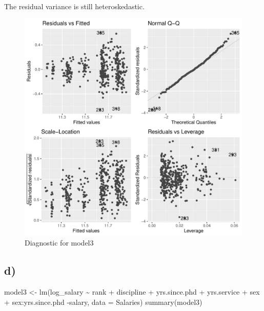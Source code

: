 \documentclass[
]{article}
\newenvironment{Shaded}{\begin{snugshade}}{\end{snugshade}}
\newcommand{\AttributeTok}[1]{\textcolor[rgb]{0.77,0.63,0.00}{#1}}
\newcommand{\ConstantTok}[1]{\textcolor[rgb]{0.00,0.00,0.00}{#1}}
\newcommand{\FunctionTok}[1]{\textcolor[rgb]{0.00,0.00,0.00}{#1}}
\newcommand{\NormalTok}[1]{#1}
\newcommand{\OtherTok}[1]{\textcolor[rgb]{0.56,0.35,0.01}{#1}}
\newcommand{\SpecialCharTok}[1]{\textcolor[rgb]{0.00,0.00,0.00}{#1}}
\begin{document}
The residual variance is still heteroskedastic.

\begin{Shaded}
\end{Shaded}

\begin{figure}

{\centering \includegraphics[width=0.7\linewidth]{Exercise1_files/figure-latex/fig_model_check_log-transform-1} 

}

\caption{Diagnostic for model3}\label{fig:fig_model_check_log-transform}
\end{figure}

\hypertarget{d-1}{%
\subsection{d)}\label{d-1}}

\begin{Shaded}
\begin{Highlighting}[]
\NormalTok{model3 }\OtherTok{\textless{}{-}} \FunctionTok{lm}\NormalTok{(log\_salary }\SpecialCharTok{\textasciitilde{}}\NormalTok{ rank }\SpecialCharTok{+}\NormalTok{ discipline }\SpecialCharTok{+}\NormalTok{ yrs.since.phd }\SpecialCharTok{+}\NormalTok{ yrs.service }\SpecialCharTok{+}\NormalTok{ sex }\SpecialCharTok{+}\NormalTok{ sex}\SpecialCharTok{:}\NormalTok{yrs.since.phd }\SpecialCharTok{{-}}\NormalTok{salary, }\AttributeTok{data =}\NormalTok{ Salaries)}
\FunctionTok{summary}\NormalTok{(model3)}
\end{Highlighting}
\end{Shaded}
\end{document}
